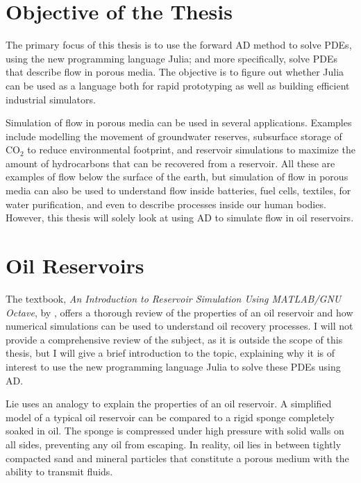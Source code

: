 \section{Objective of the Thesis}
The primary focus of this thesis is to use the forward AD method to solve PDEs, using the new programming language Julia; and more specifically, solve PDEs that describe flow in porous media. The objective is to figure out whether Julia can be used as a language both for rapid prototyping as well as building efficient industrial simulators. 

Simulation of flow in porous media can be used in several applications. Examples include modelling the movement of groundwater reserves, subsurface storage of CO$_2$ to reduce environmental footprint, and reservoir simulations to maximize the amount of hydrocarbons that can be recovered from a reservoir. All these are examples of flow below the surface of the earth, but simulation of flow in porous media can also be used to understand flow inside batteries, fuel cells, textiles, for water purification, and even to describe processes inside our human bodies. However, this thesis will solely look at using AD to simulate flow in oil reservoirs.

\section{Oil Reservoirs}
\label{sec:OilReservoirs}
The textbook, \textit{An Introduction to Reservoir Simulation Using MATLAB/GNU Octave}, by \emph{\citet{lieMrstUrl}}, offers a thorough review of the properties of an oil reservoir and how numerical simulations can be used to understand oil recovery processes. I will not provide a comprehensive review of the subject, as it is outside the scope of this thesis, but I will give a brief introduction to the topic, explaining why it is of interest to use the new programming language Julia to solve these PDEs using AD.

Lie uses an analogy to explain the properties of an oil reservoir. A simplified model of a typical oil reservoir can be compared to a rigid sponge completely soaked in oil. The sponge is compressed under high pressure with solid walls on all sides, preventing any oil from escaping. In reality, oil lies in between tightly compacted sand and mineral particles that constitute a porous medium with the ability to transmit fluids. 

